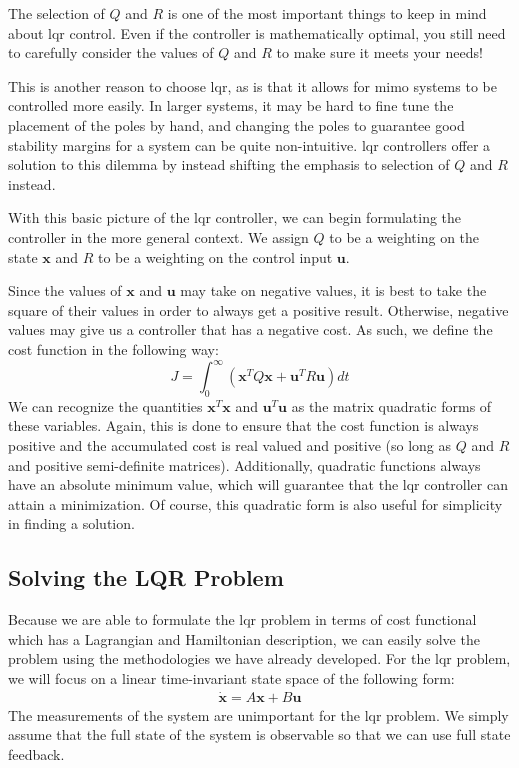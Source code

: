 The selection of $Q$ and $R$ is one of the most important things to keep in mind about \gls{lqr} control. Even if the controller is mathematically optimal, you still need to carefully consider the values of $Q$ and $R$ to make sure it meets your needs!

This is another reason to choose \gls{lqr}, as is that it allows for \gls{mimo} systems to be controlled more easily. In larger systems, it may be hard to fine tune the placement of the poles by hand, and changing the poles to guarantee good stability margins for a system can be quite non-intuitive. \Gls{lqr} controllers offer a solution to this dilemma by instead shifting the emphasis to selection of $Q$ and $R$ instead.

With this basic picture of the \gls{lqr} controller, we can begin formulating the controller in the more general context. We assign $Q$ to be a weighting on the state $\bm{x}$ and $R$ to be a weighting on the control input $\bm{u}$.

Since the values of $\bm{x}$ and $\bm{u}$ may take on negative values, it is best to take the square of their values in order to always get a positive result. Otherwise, negative values may give us a controller that has a negative cost. As such, we define the cost function in the following way:
$$J=\int_0^\infty(\bm{x}^TQ\bm{x}+\bm{u}^TR\bm{u})dt$$
We can recognize the quantities $\bm{x}^T\bm{x}$ and $\bm{u}^T\bm{u}$ as the matrix quadratic forms of these variables. Again, this is done to ensure that the cost function is always positive and the accumulated cost is real valued and positive (so long as $Q$ and $R$ and positive semi-definite matrices). Additionally, quadratic functions always have an absolute minimum value, which will guarantee that the \gls{lqr} controller can attain a minimization. Of course, this quadratic form is also useful for simplicity in finding a solution.

\subsection{Solving the LQR Problem}
Because we are able to formulate the \gls{lqr} problem in terms of cost functional which has a \gls{Lagrangian} and \gls{Hamiltonian} description, we can easily solve the problem using the methodologies we have already developed. For the \gls{lqr} problem, we will focus on a linear time-invariant state space of the following form:
\begin{gather}
\bm{\dot{x}}=A\bm{x}+B\bm{u}
\end{gather}
The measurements of the system are unimportant for the \gls{lqr} problem. We simply assume that the full state of the system is observable so that we can use full state feedback.

